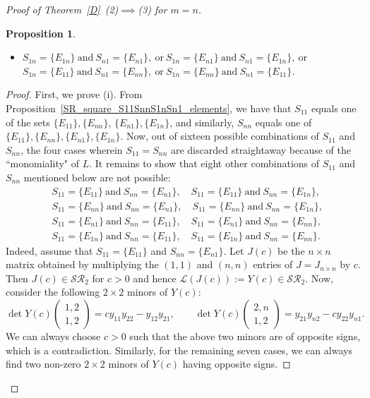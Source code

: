\documentclass[11pt,reqno]{amsart}
\theoremstyle{plain}
\newtheorem{prop}[theorem]{Proposition}
\theoremstyle{definition}
\numberwithin{equation}{section}
\begin{document}
\begin{proof}[Proof of Theorem~\ref{D}~(2)$\implies$(3) for $m=n$]
\begin{prop}
\begin{itemize}
			\item[(ii)] $S_{1n}=\{E_{1n}\} \ \text{and}\ S_{n1}=\{E_{n1}\}, \ \text{or}\ S_{1n}=\{E_{n1}\} \ \text{and}\ S_{n1}=\{E_{1n}\}, \ \text{or}$ \\
			$S_{1n}=\{E_{11}\} \ \text{and}\ S_{n1}=\{E_{nn}\}, \ \text{or}\ S_{1n}=\{E_{nn}\} \ \text{and}\ S_{n1}=\{E_{11}\}$.
		\end{itemize}
	\end{prop}
	\begin{proof} First, we prove (i). From Proposition~\ref{SR_square_S11SnnS1nSn1_elements}, we have that $S_{11}$ equals one of the sets $\{E_{11}\},\{E_{nn}\}$, $\{E_{n1}\}, \{E_{1n}\}$, and similarly, $S_{nn}$ equals one of $\{E_{11}\}, \{E_{nn}\}, \{E_{n1}\}, \{E_{1n}\}$. Now, out of sixteen possible combinations of $S_{11}$ and $S_{nn}$, the four cases wherein $S_{11}=S_{nn}$ are discarded straightaway because of the ``monomiality" of $L$. It remains to show that eight other combinations of $S_{11}$ and $S_{nn}$ mentioned below are not possible:
		\begin{align*}
			&S_{11}=\{E_{11}\} ~\text{and}~ S_{nn}=\{E_{n1}\}, \quad 
			S_{11}=\{E_{11}\} ~\text{and}~ S_{nn}=\{E_{1n}\}, \\
			&S_{11}=\{E_{nn}\} ~\text{and}~ S_{nn}=\{E_{n1}\}, \quad 
			S_{11}=\{E_{nn}\} ~\text{and}~ S_{nn}=\{E_{1n}\}, \\
			&S_{11}=\{E_{n1}\} ~\text{and}~ S_{nn}=\{E_{11}\}, \quad
			S_{11}=\{E_{n1}\} ~\text{and}~ S_{nn}=\{E_{nn}\}, \\
			&S_{11}=\{E_{1n}\} ~\text{and}~ S_{nn}=\{E_{11}\}, \quad
			S_{11}=\{E_{1n}\} ~\text{and}~ S_{nn}=\{E_{nn}\}.
		\end{align*}
	Indeed, assume that $S_{11}=\{E_{11}\}$ and $S_{nn}=\{E_{n1}\}$. Let $J(c)$ be the $n\times n$ matrix obtained by multiplying the $(1,1)$ and $(n,n)$ entries of $J=J_{n\times n}$ by $c$. Then $J(c)\in \mathcal{SR}_2$ for $c>0$ and hence $\mathcal{L}(J(c)):=Y(c)\in \mathcal{SR}_2$. Now, consider the following $2 \times 2$ minors of $Y(c)$:
		\[\det Y(c) \begin{pmatrix}1,2\\1,2
		\end{pmatrix}=cy_{11}y_{22}-y_{12}y_{21},
		\qquad
		\det Y(c)\begin{pmatrix}2,n\\1,2
		\end{pmatrix}=y_{21}y_{n2}-cy_{22}y_{n1}.\]
	We can always choose $c>0$ such that the above two minors are of opposite signs, which is a contradiction. Similarly, for the remaining seven cases, we can always find two non-zero $2\times2$ minors of $Y(c)$ having opposite signs.
		

\end{proof}
\end{proof}
\end{document}
